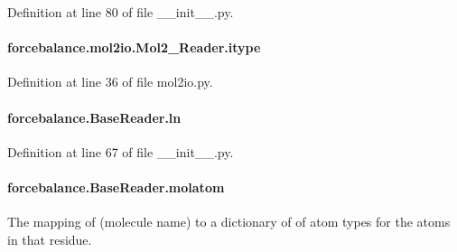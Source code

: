 Definition at line 80 of file \-\_\-\-\_\-init\-\_\-\-\_\-.\-py.

\hypertarget{classforcebalance_1_1mol2io_1_1Mol2__Reader_a86efd5020943bd5cb52a9299e88a4fac}{
\paragraph[{itype}]{\setlength{\rightskip}{0pt plus 5cm}forcebalance.\-mol2io.\-Mol2\-\_\-\-Reader.\-itype}}\label{classforcebalance_1_1mol2io_1_1Mol2__Reader_a86efd5020943bd5cb52a9299e88a4fac}


Definition at line 36 of file mol2io.\-py.

\hypertarget{classforcebalance_1_1BaseReader_a80c8e3bea212600742968aa8669e557b}{
\paragraph[{ln}]{\setlength{\rightskip}{0pt plus 5cm}forcebalance.\-Base\-Reader.\-ln\hspace{0.3cm}{\ttfamily [inherited]}}}\label{classforcebalance_1_1BaseReader_a80c8e3bea212600742968aa8669e557b}


Definition at line 67 of file \-\_\-\-\_\-init\-\_\-\-\_\-.\-py.

\hypertarget{classforcebalance_1_1BaseReader_ab444c213e15929253dd73395ac5f19fc}{
\paragraph[{molatom}]{\setlength{\rightskip}{0pt plus 5cm}forcebalance.\-Base\-Reader.\-molatom\hspace{0.3cm}{\ttfamily [inherited]}}}\label{classforcebalance_1_1BaseReader_ab444c213e15929253dd73395ac5f19fc}


The mapping of (molecule name) to a dictionary of of atom types for the atoms in that residue. 


